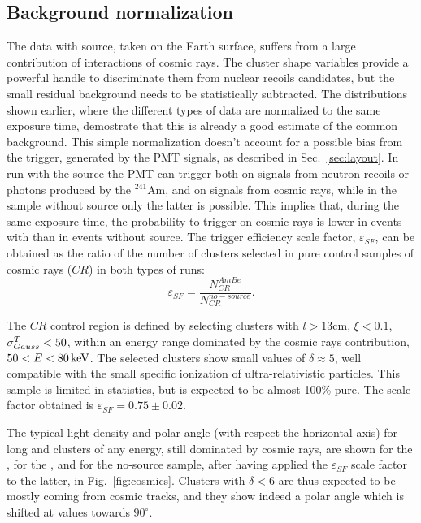 \subsection{Background normalization}
\label{sec:background}
The data with \ambe source, taken on the Earth surface, suffers from a
large contribution of interactions of cosmic rays. The cluster shape
variables provide a powerful handle to discriminate them from nuclear
recoils candidates, but the small residual background needs to be
statistically subtracted. The distributions shown earlier, where the
different types of data are normalized to the same exposure time,
demostrate that this is already a good estimate of the common
background. This simple normalization doesn't account for a possible
bias from the trigger, generated by the PMT signals, as described in
Sec.~\ref{sec:layout}. In run with the \ambe source the PMT can
trigger both on signals from neutron recoils or photons produced by
the $^{241}$Am, and on signals from cosmic rays, while in the sample
without source only the latter is possible.  This implies that, during
the same exposure time, the probability to trigger on cosmic rays is
lower in events with \ambe than in events without source. The trigger
efficiency scale factor, $\varepsilon_{SF}$, can be obtained as the ratio of the
number of clusters selected in pure control samples of cosmic rays ($CR$) in
both types of runs:
\begin{equation}
\label{eq:sfeff}
\varepsilon_{SF} = \frac{N^{AmBe}_{CR}}{N^{no-source}_{CR}}.
\end{equation}

The $CR$ control region is defined by selecting clusters with
$l>13$\unit{cm}, $\xi<0.1$, $\sigma^T_{Gauss}<50$, within an energy range
dominated by the cosmic rays contribution, $50<E<80\,\textrm{ke\hspace{-.08em}V}$. The selected
clusters show small values of $\delta\approx5$, well compatible with
the small specific ionization of ultra-relativistic particles.  This
sample is limited in statistics, but is expected to be almost 100\%
pure. The scale factor obtained is $\varepsilon_{SF}=0.75\pm0.02$.

The typical light density and polar angle (with respect the horizontal
axis) for long and clusters of any energy, still dominated by cosmic
rays, are shown for the \ambe, for the \fe, and for the no-source
sample, after having applied the $\varepsilon_{SF}$ scale factor to
the latter, in Fig.~\ref{fig:cosmics}. Clusters with $\delta<6$ are
thus expected to be mostly coming from cosmic tracks, and they show
indeed a polar angle which is shifted at values towards $90^\circ$.


